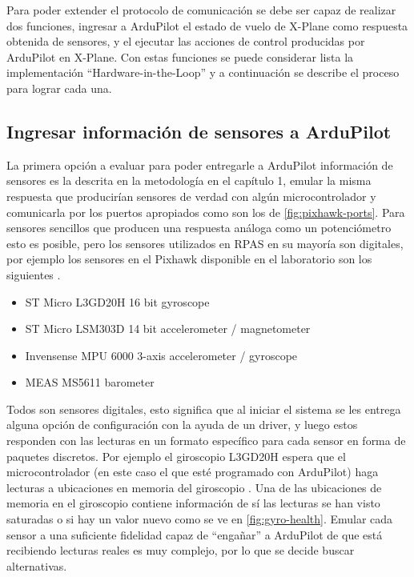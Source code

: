 Para poder extender el protocolo de comunicación se debe ser capaz de realizar dos funciones, ingresar a ArduPilot el estado de vuelo de X-Plane como respuesta obtenida de sensores, y el ejecutar las acciones de control producidas por ArduPilot en X-Plane. Con estas funciones se puede considerar lista la implementación ``Hardware-in-the-Loop'' y a continuación se describe el proceso para lograr cada una.

\subsection{Ingresar información de sensores a ArduPilot}

La primera opción a evaluar para poder entregarle a ArduPilot información de sensores es la descrita en la metodología en el capítulo 1, emular la misma respuesta que producirían sensores de verdad con algún microcontrolador y comunicarla por los puertos apropiados como son los de \cref{fig:pixhawk-ports}. Para sensores sencillos que producen una respuesta análoga como un potenciómetro esto es posible, pero los sensores utilizados en RPAS en su mayoría son digitales, por ejemplo los sensores en el Pixhawk disponible en el laboratorio son los siguientes \cite{pixhawk1}.

\begin{itemize}
    \item ST Micro L3GD20H 16 bit gyroscope
    \item ST Micro LSM303D 14 bit accelerometer / magnetometer
    \item Invensense MPU 6000 3-axis accelerometer / gyroscope
    \item MEAS MS5611 barometer
\end{itemize}

Todos son sensores digitales, esto significa que al iniciar el sistema se les entrega alguna opción de configuración con la ayuda de un driver, y luego estos responden con las lecturas en un formato específico para cada sensor en forma de paquetes discretos. Por ejemplo el giroscopio L3GD20H espera que el microcontrolador (en este caso el que esté programado con ArduPilot) haga lecturas a ubicaciones en memoria del giroscopio \cite{gyro-datasheet}. Una de las ubicaciones de memoria en el giroscopio contiene información de sí las lecturas se han visto saturadas o si hay un valor nuevo como se ve en \cref{fig:gyro-health}. Emular cada sensor a una suficiente fidelidad capaz de ``engañar'' a ArduPilot de que está recibiendo lecturas reales es muy complejo, por lo que se decide buscar alternativas.

